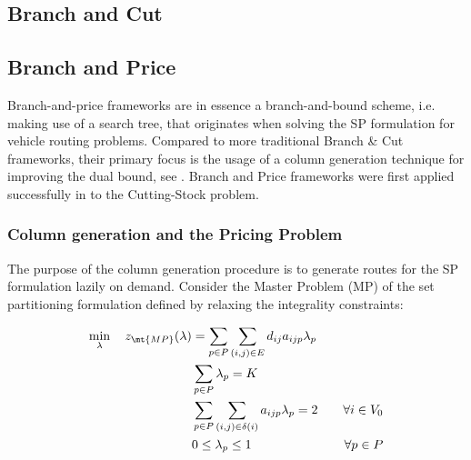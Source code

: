 \subsection{Branch and Cut}
\label{sec:intro-branch-and-cut}


\subsection{Branch and Price}
\label{sec:intro-branch-and-price}

Branch-and-price frameworks are in essence a branch-and-bound scheme, i.e. making use of a search tree, that originates when solving the SP formulation for vehicle routing problems.
Compared to more traditional Branch \& Cut frameworks, their primary focus is the usage of a column generation technique for improving the dual bound, see \textcite{righini2008}.
Branch and Price frameworks were first applied successfully in \textcite{gilmore1961} to the Cutting-Stock problem.

\subsubsection{Column generation and the Pricing Problem}
\label{sec:column-generation-and-pricing-problem}

The purpose of the column generation procedure is to generate routes for the SP formulation lazily on demand.
Consider the Master Problem (MP) of the set partitioning formulation defined by relaxing the integrality constraints:

\begin{align}
	\min_{\lambda} \quad z_\mt{MP}(\lambda) & = \sum_{p \in P} \sum_{(i, j) \in E} d_{ij} a_{ijp} \lambda_p \label{eq:mp-obj-func}                                                                                                                             \\
	                                        & \sum_{p \in P} \lambda_{p} = K                                                       & \label{eq:mp-K-routes}                                                                                                    \\
	                                        & \sum_{p \in P} \sum_{(i, j) \in \delta(i)} a_{ijp} \lambda_p = 2                     & \quad \forall i \in V_0                                              \label{eq:mp-customers-visited-by-exactly-one-route} \\
	                                        & 0 \le \lambda_p \le 1                                                                & \quad \forall p \in P \label{eq:mp-lambda-mip-var-bounds}
\end{align}


